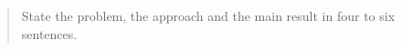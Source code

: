 \begin{abstract}
State the problem, the approach and the main result in four to six sentences.
\end{abstract}

